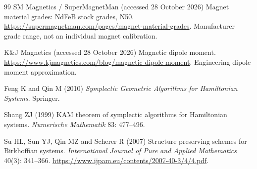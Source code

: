 \begin{thebibliography}{99}
SM Magnetics / SuperMagnetMan (accessed 28 October 2026) Magnet material grades: NdFeB stock grades, N50.
\url{https://supermagnetman.com/pages/magnet-material-grades}.
Manufacturer grade range, not an individual magnet calibration.

K\&J Magnetics (accessed 28 October 2026) Magnetic dipole moment.
\url{https://www.kjmagnetics.com/blog/magnetic-dipole-moment}.
Engineering dipole-moment approximation.

Feng K and Qin M (2010) \textit{Symplectic Geometric Algorithms for Hamiltonian Systems}. Springer.

Shang ZJ (1999) KAM theorem of symplectic algorithms for Hamiltonian systems.
\textit{Numerische Mathematik} 83: 477--496. 

Su HL, Sun YJ, Qin MZ and Scherer R (2007) Structure preserving schemes for Birkhoffian systems.
\textit{International Journal of Pure and Applied Mathematics} 40(3): 341--366.
\url{https://www.ijpam.eu/contents/2007-40-3/4/4.pdf}.

\end{thebibliography}
